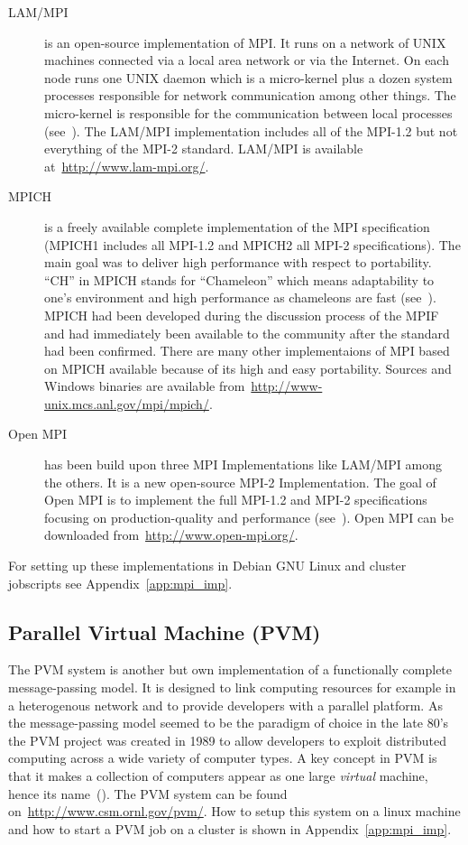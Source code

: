 \begin{description}
\item[LAM/MPI] is an open-source implementation of MPI. It runs on a
  network of UNIX machines connected via a local area network or via
  the Internet. On each node runs one UNIX daemon which is a
  micro-kernel plus a dozen system processes responsible for network
  communication among other things. The micro-kernel is
  responsible for the communication between local processes
  (see~\cite{burns94lam}). The LAM/MPI implementation includes all of
  the MPI-1.2 but not everything of the MPI-2 standard. LAM/MPI is
  available at~\url{http://www.lam-mpi.org/}.
\item[MPICH] is a freely available complete implementation of the MPI
  specification (MPICH1 includes all MPI-1.2 and MPICH2 all MPI-2
  specifications). The main goal was to deliver high performance with
  respect to portability. ``CH'' in MPICH stands for ``Chameleon''
  which means adaptability to one's environment and high performance
  as chameleons are fast (see~\cite{gropp96mpich}). MPICH had been
  developed during the discussion process of the MPIF and had immediately been
  available to the community after the standard had been
  confirmed. There are many other implementaions of MPI based on MPICH
  available because of its high and easy portability. Sources and
  Windows binaries are available
  from~\url{http://www-unix.mcs.anl.gov/mpi/mpich/}.
\item[Open MPI] has been build upon three MPI Implementations like
  LAM/MPI among the others. It is a new open-source MPI-2
  Implementation. The goal of Open MPI is to implement the full
  MPI-1.2 and MPI-2 specifications focusing on production-quality and
  performance (see~\cite{gabriel04:_open_mpi}). Open MPI can be
  downloaded from~\url{http://www.open-mpi.org/}.
\end{description}

For setting up these implementations in Debian GNU Linux and cluster
jobscripts see Appendix~\ref{app:mpi_imp}. 

\subsection{Parallel Virtual Machine (PVM)}
\label{sec:PVM}

The PVM system is another but own implementation of a functionally
complete message-passing model. It is designed to link computing
resources for example in a heterogenous network and to provide
developers with a parallel platform. As the message-passing model
seemed to be the paradigm of choice in the late 80's the PVM project
was created in 1989 to allow developers to exploit distributed
computing across a wide variety of computer types. A key concept in
PVM is that it makes a collection of computers appear as one large
\textit{virtual} machine, hence its name~(\cite{geist94pvm}). The PVM
system can be found on~\url{http://www.csm.ornl.gov/pvm/}. How to
setup this system on a linux machine and how to start a PVM job on a
cluster is shown in Appendix~\ref{app:mpi_imp}.

